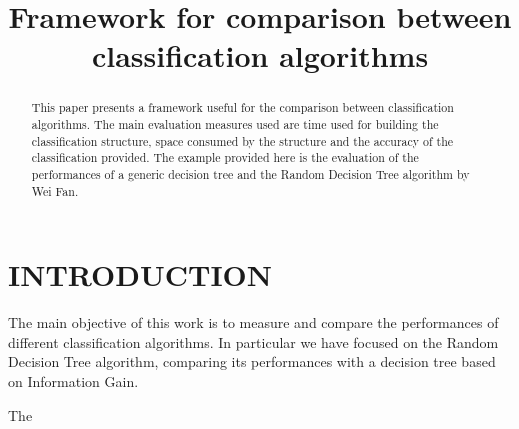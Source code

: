 \documentclass{acm_proc_article-sp-sigmod07}
\begin{document}
\title{Framework for comparison between classification algorithms}

\maketitle

\begin{abstract}
This paper presents a framework useful for the comparison between
classification algorithms.
The main evaluation measures used are time used for building the
classification structure, space consumed by the structure and the accuracy
of the classification provided.
The example provided here is the evaluation of the performances of a
generic decision tree and the Random Decision Tree algorithm by Wei Fan.
\end{abstract}

\section{INTRODUCTION}
The main objective of this work is to measure and compare the performances
of different classification algorithms. In particular we have focused on
the Random Decision Tree algorithm, comparing its performances with a
decision tree based on Information Gain.

The 
\end{document}
